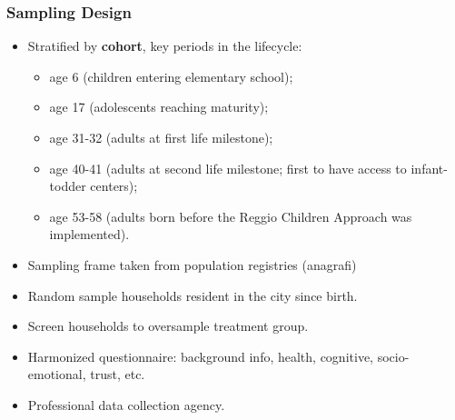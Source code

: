 \documentclass{beamer}
\begin{document}
%
%
\begin{frame}
\frametitle{Sampling Design}\label{frame:design}
\begin{itemize}
	\item Stratified by \textbf{cohort}, key periods in the lifecycle:
	\begin{itemize}
		\item age 6 (children entering elementary school);
		\item age 17 (adolescents reaching maturity);
		\item age 31-32 (adults at first life milestone);
		\item age 40-41 (adults at second life milestone; first to have access to infant-todder centers);
		\item age 53-58 (adults born before the Reggio Children Approach was implemented).
	\end{itemize}
	\item Sampling frame taken from population registries (anagrafi)
	\item Random sample households resident in the city since birth. \hyperlink{frame:TotRefSample}{\beamergotobutton{}}
	\item Screen households to oversample treatment group.
	\item Harmonized questionnaire: background info, health, cognitive, socio-emotional, trust, etc.
	\item Professional data collection agency.
\end{itemize}
\end{frame} 
\end{document}
